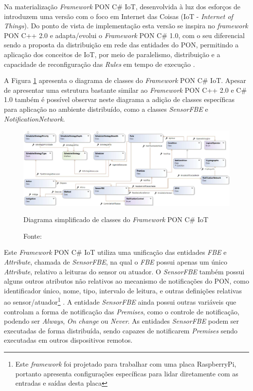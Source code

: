 Na materialização \textit{Framework} PON C\# IoT, desenvolvida à luz dos
esforços de  introduzem uma versão com o foco em
Internet das Coisas (IoT - \textit{Internet of Things}). Do ponto de vista de
implementação esta versão se inspira no \textit{framework} PON C++ 2.0 e
adapta/evolui o \textit{Framework} PON C\# 1.0, com o seu diferencial sendo a
proposta da distribuição em rede das entidades do PON, permitindo a aplicação
dos conceitos de IoT, por meio de paralelismo, distribuição e a capacidade de
reconfiguração das \textit{Rules} em tempo de execução \cite{msc_oliveira_2019}.

A Figura \ref{fig:classes_pon_iot} apresenta o diagrama de classes do
\textit{Framework} PON C\# IoT. Apesar de apresentar uma estrutura bastante
similar ao \textit{Framework} PON C++ 2.0 e C\# 1.0 também é possível observar
neste diagrama a adição de classes específicas para aplicação no ambiente
distribuído, como a classes \textit{SensorFBE} e \textit{NotificationNetwork}.

\begin{figure}[!htb]
  \centering
  \includegraphics[width=\textwidth]{../figures/classes_pon_iot.png}
  \caption{Diagrama simplificado de classes do \textit{Framework} PON C\# IoT}
  \caption*{Fonte: }
  \label{fig:classes_pon_iot}
\end{figure}

Este \textit{Framework} PON C\# IoT utiliza uma unificação das entidades
\textit{FBE} e \textit{Attribute}, chamada de \textit{SensorFBE}, na qual o
\textit{FBE} possui apenas um único \textit{Attribute}, relativo a leituras do
sensor ou atuador. O \textit{SensorFBE} também possui alguns outros atributos
não relativos ao mecanismo de notificações do PON, como identificador único,
nome, tipo, intervalo de leitura, e outras definições relativas ao
sensor/atuador\footnote{Este \textit{framework} foi projetado para trabalhar com
uma placa RaspberryPi, portanto apresenta configurações específicas para lidar
diretamente com as entradas e saídas desta placa} \cite{msc_oliveira_2019}. A
entidade \textit{SensorFBE} ainda possui outras variáveis que controlam a forma
de notificação das \textit{Premises}, como o controle de notificação, podendo
ser \textit{Always}, \textit{On change} ou \textit{Never}. As entidades
\textit{SensorFBE} podem ser executadas de forma distribuída, sendo capazes de
notificarem \textit{Premises} sendo executadas em outros dispositivos remotos.

